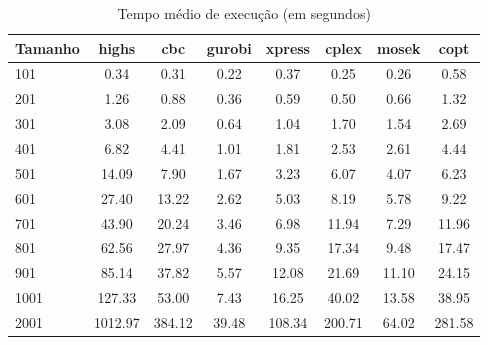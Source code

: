 \begin{table}[htbp]
\centering
\caption{Tempo médio de execução (em segundos)}
\label{tab:tempo_execucao}
\begin{tabular}{lccccccc}
\toprule
Tamanho & highs & cbc & gurobi & xpress & cplex & mosek & copt \\
\midrule
101 & 0.34 & 0.31 & 0.22 & 0.37 & 0.25 & 0.26 & 0.58 \\
201 & 1.26 & 0.88 & 0.36 & 0.59 & 0.50 & 0.66 & 1.32 \\
301 & 3.08 & 2.09 & 0.64 & 1.04 & 1.70 & 1.54 & 2.69 \\
401 & 6.82 & 4.41 & 1.01 & 1.81 & 2.53 & 2.61 & 4.44 \\
501 & 14.09 & 7.90 & 1.67 & 3.23 & 6.07 & 4.07 & 6.23 \\
601 & 27.40 & 13.22 & 2.62 & 5.03 & 8.19 & 5.78 & 9.22 \\
701 & 43.90 & 20.24 & 3.46 & 6.98 & 11.94 & 7.29 & 11.96 \\
801 & 62.56 & 27.97 & 4.36 & 9.35 & 17.34 & 9.48 & 17.47 \\
901 & 85.14 & 37.82 & 5.57 & 12.08 & 21.69 & 11.10 & 24.15 \\
1001 & 127.33 & 53.00 & 7.43 & 16.25 & 40.02 & 13.58 & 38.95 \\
2001 & 1012.97 & 384.12 & 39.48 & 108.34 & 200.71 & 64.02 & 281.58 \\
\bottomrule
\end{tabular}
\end{table}
